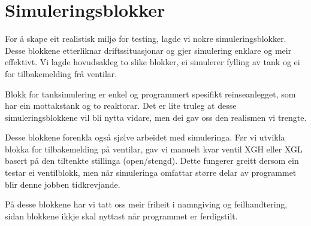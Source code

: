 \section{Simuleringsblokker}
\thispagestyle{fancy}

For å skape eit realistisk miljø for testing, lagde vi nokre simuleringsblokker.
Desse blokkene etterliknar driftssituasjonar og gjer simulering enklare og meir effektivt.
Vi lagde hovudsakleg to slike blokker, ei simulerer fylling av tank
og ei for tilbakemelding frå ventilar.

Blokk for tanksimulering er enkel og programmert spesifikt reinseanlegget, 
som har ein mottakstank og to reaktorar.
Det er lite truleg at desse simuleringsblokkene vil bli nytta vidare, men dei gav
oss den realismen vi trengte.

Desse blokkene forenkla også sjølve arbeidet med simuleringa.
Før vi utvikla blokka for tilbakemelding på ventilar, 
gav vi manuelt kvar ventil XGH eller XGL basert på den tiltenkte stillinga (open/stengd). \newline
Dette fungerer greitt dersom ein testar ei ventilblokk, men
når simuleringa omfattar større delar av programmet blir denne jobben tidkrevjande.

På desse blokkene har vi tatt oss meir friheit i namngiving og feilhandtering, sidan blokkene ikkje skal nyttast når programmet er ferdigstilt.


